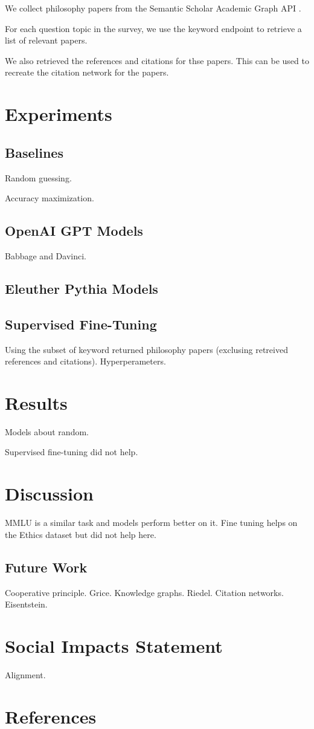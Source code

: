 \documentclass{article}
\newcommand{\pcite}[1]{\parencite{#1}}
\begin{document}
We collect philosophy papers from the Semantic Scholar Academic Graph API \pcite{kinney2023semantic}.

For each question topic in the survey, we use the keyword endpoint to retrieve a list of relevant papers. 

We also retrieved the references and citations for thse papers. 
This can be used to recreate the citation network for the papers.


\section{Experiments}

\subsection{Baselines}

Random guessing.

Accuracy maximization.

\subsection{OpenAI GPT Models}

Babbage and Davinci.

\subsection{Eleuther Pythia Models}

\subsection{Supervised Fine-Tuning}

Using the subset of keyword returned philosophy papers (exclusing retreived references and citations).
Hyperperameters.


\section{Results}

Models about random.

Supervised fine-tuning did not help.


\section{Discussion}

MMLU is a similar task and models perform better on it.
Fine tuning helps on the Ethics dataset but did not help here.


\subsection{Future Work}

Cooperative principle. Grice.
Knowledge graphs. Riedel.
Citation networks. Eisentstein.

\section*{Social Impacts Statement}
Alignment.

\section*{References}
\printbibliography[heading=none]
\end{document}

